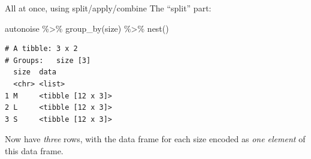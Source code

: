 \documentclass[
  ignorenonframetext,
]{beamer}
\newenvironment{Shaded}{\begin{snugshade}}{\end{snugshade}}
\newcommand{\FunctionTok}[1]{\textcolor[rgb]{0.28,0.35,0.67}{#1}}
\newcommand{\NormalTok}[1]{\textcolor[rgb]{0.00,0.23,0.31}{#1}}
\newcommand{\SpecialCharTok}[1]{\textcolor[rgb]{0.37,0.37,0.37}{#1}}
\begin{document}
\begin{frame}[fragile]{All at once, using split/apply/combine}
\protect\hypertarget{all-at-once-using-splitapplycombine}{}
The ``split'' part:

\begin{Shaded}
\begin{Highlighting}[]
\NormalTok{autonoise }\SpecialCharTok{\%\textgreater{}\%}
  \FunctionTok{group\_by}\NormalTok{(size) }\SpecialCharTok{\%\textgreater{}\%}
  \FunctionTok{nest}\NormalTok{()}
\end{Highlighting}
\end{Shaded}

\begin{verbatim}
# A tibble: 3 x 2
# Groups:   size [3]
  size  data             
  <chr> <list>           
1 M     <tibble [12 x 3]>
2 L     <tibble [12 x 3]>
3 S     <tibble [12 x 3]>
\end{verbatim}

Now have \emph{three} rows, with the data frame for each size encoded as
\emph{one element} of this data frame.
\end{frame}
\end{document}

